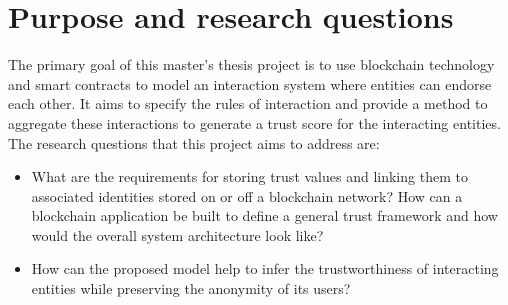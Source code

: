 \section{Purpose and research questions} \label{ResearchQuestions}
The primary goal of this master's thesis project is to use blockchain
technology and smart contracts to model an interaction system where entities
can endorse each other. It aims to specify the rules of interaction and provide
a method to aggregate these interactions to generate a trust score for the
interacting entities. The research questions that this project aims to address
are: 
\begin{itemize}
		\item What are the requirements for storing trust values and linking
			them to associated identities stored on or off a blockchain
			network? How can a blockchain application be built to define a
			general trust framework and how would the overall system
			architecture look like?\label{question2} 
		\item How can the proposed model help to infer the trustworthiness of
			interacting entities while preserving the anonymity of its users? 
\end{itemize}
